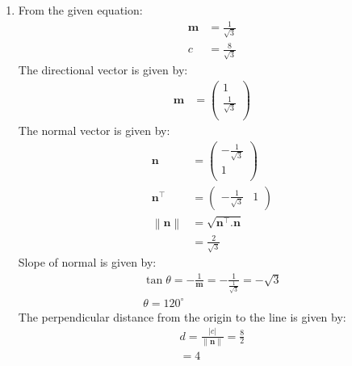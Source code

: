 \documentclass[12pt]{article}
\providecommand{\norm}[1]{\left\lVert#1\right\rVert}
\newcommand{\myvec}[1]{\ensuremath{\begin{pmatrix}#1\end{pmatrix}}}
\let\vec\mathbf
\begin{document}
\begin{enumerate}
\item From the given equation:
	\begin{align}
		\vec{m}&=\frac{1}{\sqrt{3}}\\
		c&=\frac{8}{\sqrt{3}}
	\end{align}
        The directional vector is given by:
	\begin{align}
		\vec{m}&=\myvec{1\\\frac{1}{\sqrt{3}}\\}
	\end{align}
	The normal vector is given by:
		\begin{align}
	\vec{n}&=\myvec{-\frac{1}{\sqrt{3}}\\1\\}\\
	\vec{n}^\top&=\myvec{-\frac{1}{\sqrt{3}} & 1}\\
			\norm{\vec{n}}&=\sqrt{\vec{n}^\top.\vec{n}}\\
			&=\frac{2}{\sqrt{3}}
			\end{align}
	Slope of normal is given by:
		\begin{align}
			\tan\theta=-\frac{1}{\vec{m}}=-\frac{1}{\frac{1}{\sqrt{3}}}=-\sqrt{3}\\
			\theta=120^\circ
		\end{align}
	The perpendicular distance from the origin to the line is given by:
		\begin{align}
			d=\frac{|c|}{\norm{\vec{n}}}=\frac{8}{2}\\
			=4
		\end{align}

	


\end{enumerate}
\end{document}
